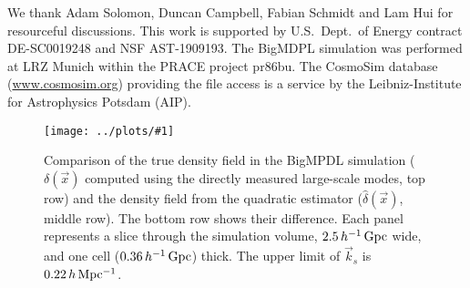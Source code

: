 \documentclass[prd,amsmath,amssymb,floatfix,superscriptaddress,nofootinbib,twocolumn]{revtex4-1}
\newcommand{\vk}{\vec{k}}
\newcommand{\ec}[1]{Eq.~(\ref{eq:#1})}
\newcommand{\sfigg}[2]{
\texttt{[image: ../plots/\#1]}
        }
\newcommand{\Sfigg}[2]{
   \begin{figure}[thbp]
    \sfigg{../plots/#1.pdf}{.8\paperwidth}
    \caption{{\small #2}}
    \label{fig:#1}
   \end{figure}
}
\begin{document}

%

\noindent We thank Adam Solomon, Duncan Campbell, Fabian Schmidt and Lam Hui for resourceful discussions.  This work is supported by U.S.\ Dept.\ of Energy contract DE-SC0019248 and NSF AST-1909193.
The BigMDPL simulation was performed at LRZ Munich within the PRACE project pr86bu. The CosmoSim database (\url{www.cosmosim.org}) providing the file access is a service by the Leibniz-Institute for Astrophysics Potsdam (AIP).

\onecolumngrid
\Sfigg{real}{Comparison of the true density field in the BigMPDL simulation ($\delta(\vec{x})$ computed using the directly measured large-scale modes, top row) and the density field from the quadratic estimator ($\hat{\delta}(\vec{x})$, middle row). The bottom row shows their difference. Each panel represents a slice through the simulation volume,  $2.5 \,h^{-1}\,\rm Gpc$ wide, and one cell ($0.36 \,h^{-1}\,\rm Gpc$) thick.  The upper limit of $\vk_s$ is $0.22 \,h\, \rm Mpc^{-1}$.}
\twocolumngrid


\end{document}
